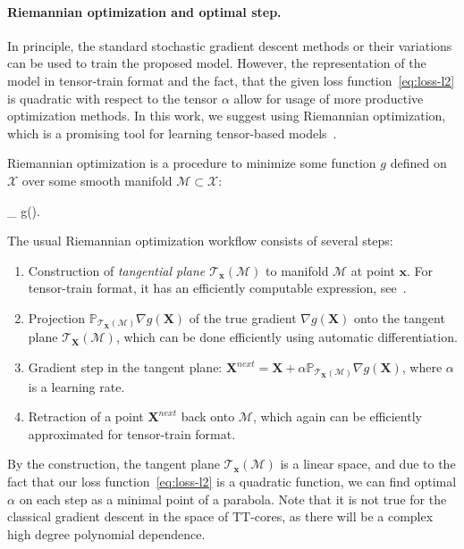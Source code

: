 \documentclass[accepted]{uai2021}
\renewcommand\vec{\boldsymbol}
\newcommand\set{\mathcal}
\begin{document}
  \paragraph{Riemannian optimization and optimal step.}
  \label{sec:theory:optimization}
  In principle, the standard stochastic gradient descent methods or their variations can be used to train the proposed model. However, the representation of the model in tensor-train format and the fact, that the given loss function~\eqref{eq:loss-l2} is quadratic with respect to the tensor $\alpha$ allow for usage of more productive optimization methods. In this work, we suggest using Riemannian optimization, which is a promising tool for learning tensor-based models~\citep{Rakhuba2019,Steinlechner2016}.

  Riemannian optimization is a procedure to minimize some function $g$ defined on $\set{X}$ over some smooth manifold $\set{M} \subset \set{X}$:
  \begin{EQA}[l]
    \min_{\vec{X} \in \set{M}} g(\vec{X}).
  \end{EQA}
  The usual Riemannian optimization workflow consists of several steps:
  \begin{enumerate}
    \item Construction of \emph{tangential plane $\set{T}_{\vec{x}}(\set{M})$} to manifold $\set{M}$ at point $\vec{x}$. For tensor-train format, it has an efficiently computable expression, see~\citep{Rakhuba2019}.

    \item Projection $\mathbb{P}_{\set{T}_{\vec{X}}(\set{M})} \nabla g(\vec{X})$ of the true gradient $\nabla g(\vec{X})$ onto the tangent plane $\set{T}_{\vec{X}}(\set{M})$, which can be done efficiently using automatic differentiation.

    \item Gradient step in the tangent plane: $\vec{X}^{next} = \vec{X} + \alpha \mathbb{P}_{\set{T}_{\vec{X}}(\set{M})} \nabla g(\vec{X})$, where $\alpha$ is a learning rate.

    \item Retraction of a point $\vec{X}^{next}$ back onto $\set{M}$, which again can be efficiently approximated for tensor-train format.
  \end{enumerate}
  By the construction, the tangent plane $\set{T}_{\vec{x}}(\set{M})$ is a linear space, and due to the fact that our loss function~\eqref{eq:loss-l2} is a quadratic function, we can find optimal $\alpha$ on each step as a minimal point of a parabola. Note that it is not true for the classical gradient descent in the space of TT-cores, as there will be a complex high degree polynomial dependence.
\end{document}
